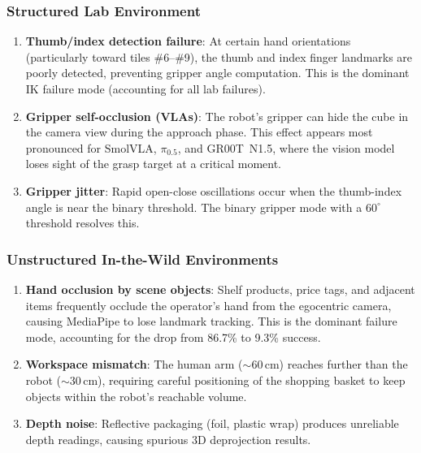 \documentclass{ieeeaccess}
\begin{document}
\subsubsection{Structured Lab Environment}
\begin{enumerate}
  \item \textbf{Thumb/index detection failure}: At certain hand
        orientations (particularly toward tiles
        \#6--\#9), the thumb and index finger landmarks are poorly
        detected, preventing gripper angle computation. This is the
        dominant IK failure mode (accounting for all lab
        failures).
  \item \textbf{Gripper self-occlusion (VLAs)}: The robot's gripper
        can hide the cube in the camera view during the approach
        phase. This effect appears most pronounced for SmolVLA,
        $\pi_{0.5}$, and GR00T~N1.5, where the vision model loses
        sight of the grasp target at a critical moment.
  \item \textbf{Gripper jitter}: Rapid open-close oscillations occur
        when the thumb-index angle is near the binary threshold. The
        binary gripper mode with a $60^{\circ}$ threshold resolves this.
\end{enumerate}

\subsubsection{Unstructured In-the-Wild Environments}
\begin{enumerate}
  \item \textbf{Hand occlusion by scene objects}: Shelf products,
        price tags, and adjacent items frequently occlude the
        operator's hand from the egocentric camera, causing MediaPipe
        to lose landmark tracking. This is the dominant failure mode,
        accounting for the drop from 86.7\% to 9.3\% success.
  \item \textbf{Workspace mismatch}: The human arm (${\sim}$60\,cm)
        reaches further than the robot (${\sim}$30\,cm), requiring
        careful positioning of the shopping basket to keep objects
        within the robot's reachable volume.
  \item \textbf{Depth noise}: Reflective packaging (foil, plastic
        wrap) produces unreliable depth readings, causing spurious
        3D deprojection results.
\end{enumerate}

\end{document}

